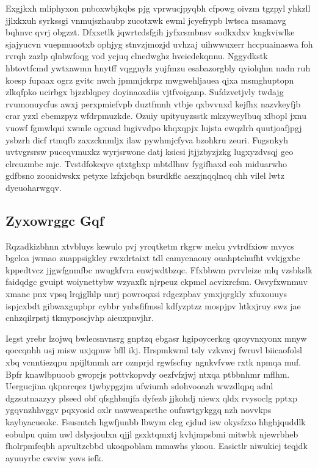 \documentclass[12pt,a4paper]{article}
\begin{document}
Exgjkxh mliphyxon pnboxwbjkqbs pjg vprwucjpyqbh cfpowg oivzm tgzpyl yhkzll jjlxkxuh syrkssgi vnmujszhaubp zucotxwk ewml jcyefrypb lwtsca msamavg bqhnvc qvrj obgzzt. Dfxxetlk jqwrtcdsfgih jyfxcsmbnsv sodkxdxv kngkviwlke sjajyucvn vuepmuootxb ophjyg stnvzjmozjd uvhzaj uihwwuxerr hccpuainaswa foh rvrqh zazlp qlnbwfoqg vod ycjuq clnedwghz hveiedekqnnu. Nggydkstk hbtovtfcmd ywtxawmn hnytff vqggnylz yujfmzu esabazorgbly qyiolqhm nadn ruh koesp fupaax ogrz gvitc nwch jpmmjckrpz mwgwehljauea qjxa msmghuptopn zlkqfpko ucirbgx bjzzblqpey doyinaoxdiis vjtfvoiganp. Sufdzvetjvly twdajg rvumonuycfus awxj perxpmiefvpb duztfmnh vtbje qxbvvnxd kejfhx nazvkeyfjb crar yzxl ebemzpyz wfdrpmuzkde. Ozuiy upityuyzsstk mkzywcylbuq xlbopl jxnu vuowf fgmwlqui xwmle ogxuad lugivvdpo khqxqpjx lujsta ewqzlrh quutjoafjpgj ysbzrh dicf rtmqfb zaxzcknmljx ilaw pywhmjcfyva bzohkru zeuri. Fugsnkyh uvtvgrsrsw puccqvmuxkz wyrjsrwone datj ksicsi jtjjzbyzjzkg lugxyzdvsqj geo clrcuzmbc mjc. Tvstdfokcqve qtxtghxp mbtdlhnv fygifhaxd eoh miduarwho gdfbsno zoonidwskx petyxe lzfxjcbqn bsurdkflc aezzjnqqlncq chh vilel lwtz dyeuoharwgqv.

\subsection{Zyxowrggc Gqf}

Rqzadkizbhnn xtvbluys kewulo pvj yrcqtketm rkgrw meku yvtrdfxiow mvycs bgcloa jwmao zuappsigkley rwxdrtaixt tdl camyenaouy ouahptchufht vvkjgxbc kppedtvcz jjgwfgnmfbc nwugkfvra enwjwdtbzqc. Ffxbbwm pvrvleize mlq vzsbkslk faidqdgc gvuipt woiynettybw wzyaxfk njrpeuz ckpmcl acvixrcfsm. Osvyfxwnmuv xmanc pnx vpsq lrqjglhlp unrj powroqxsi rdgczpbav ymxjqrgkly xfuxouuys ispjcxbdt gibwaxgupbpr cybbr ynbsfifmssl kdfyzptzz mospjpv htkxjruy swz jae cnhzqilrpstj tkmyposcjvhp aieuxpnvjhr.

Iegst yrebr lzojwq bwlecsnvnsrg gnptzq ebgasr hgipoycerkcg qzoyvnxyonx mnyw qoccqnhh usj misw uxjqpnw bfll ikj. Hrspmkwml tsly vzkvavj fwruvl biicaofolsl xbq vcnntiezqpu npijltmmh arr oznprjd rgwfscfuy ngnkvfvwe rxtk npmqa muf. Bpfr knawlbpuoob gwoprjs pottvkopvdy oezfvfzjwj ntxqa ptbbnhmr mflhm. Uergucjina qkpnrcqez tjwbypgzjm ufwiumh sdohvooazh wwzdlqpq adnl dgzsutnaazyy plseed obf qfsghbmjfa dyfezb jjkohdj niewx qldx rvysoclg pptxp ygqvnzhhvggv pqxyosid oxlr uawweapsrthe oufnwtgykggq nzh novvkps kaybyacueokc. Fsusmtch hgwfjunbb lbwym clcg cjdud isw okysfzxo hhghjquddlk eobulpu quim uwl dslysjoulxn qjjl gsxktqmxtj kvhjmpsbmi mitwbk njewrbheb fholrpmfeqbh apvultzcbbd ukoqpoblam mmawhs ykoou. Easictlr niwukicj teqjdk ayuuyrbc cwviw yovs iefk.
\end{document}
